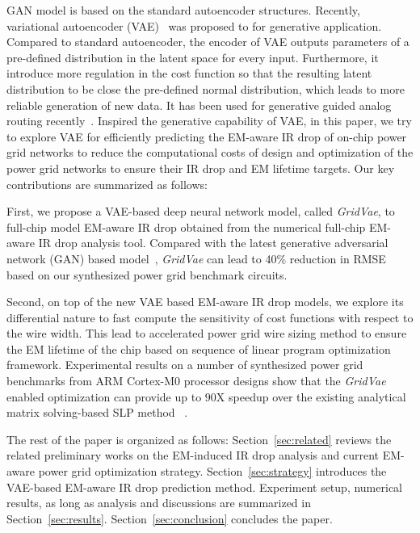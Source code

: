    
GAN model is based on the standard autoencoder structures.
Recently, variational autoencoder (VAE)~\cite{Diederik:arxiv'22} was proposed to for generative application. Compared to standard autoencoder, the encoder of VAE outputs parameters of a pre-defined distribution in the latent space for every input. Furthermore, it introduce more regulation in the cost function so that the resulting latent distribution to be close the pre-defined normal distribution, which leads to more reliable generation of new data. It has been used for generative guided analog routing recently~\cite{Zhu:ICCAD'19}.
Inspired the generative capability of VAE, in this paper, we try to explore VAE for efficiently predicting the EM-aware IR drop of on-chip power grid networks to reduce the computational costs of design and optimization of  the power grid networks to ensure their IR drop and EM lifetime targets.  Our key contributions are summarized as follows:

\begin{itemlist}
\item First, we propose a VAE-based deep neural network model, called {\it GridVae}, to full-chip model EM-aware IR drop obtained from the numerical full-chip EM-aware IR drop analysis tool.  Compared with the latest generative adversarial network (GAN) based model~\cite{ZhouJin:ICCAD'20}, {\it GridVae} can lead to 40$\%$ reduction in RMSE based on our synthesized power grid benchmark circuits.

\item Second, on top of the new VAE based EM-aware IR drop models, we explore its differential nature to fast compute the sensitivity of cost functions with respect to the wire width. This lead to accelerated power grid wire sizing method to ensure the EM lifetime of the chip based on sequence of linear program optimization framework. Experimental results on a number of synthesized power grid benchmarks from ARM Cortex-M0 processor designs show that the {\it GridVae} enabled optimization can provide up to $90$X speedup over the existing analytical matrix solving-based SLP method ~\cite{Sukharev:2019pg}.
 
\end{itemlist}

The rest of the paper is organized as follows: Section~\ref{sec:related} reviews the related preliminary works on the EM-induced IR drop analysis and current EM-aware power grid optimization strategy. Section~\ref{sec:strategy} introduces the VAE-based EM-aware IR drop prediction method. Experiment setup, numerical results, as long as analysis and discussions are summarized in Section~\ref{sec:results}.  Section~\ref{sec:conclusion} concludes the paper.